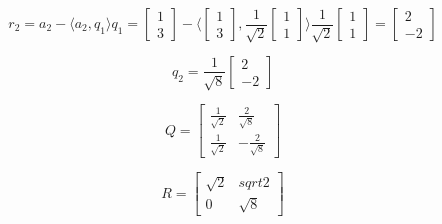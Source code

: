 \[ 
    r_2 = a_2 - \langle a_2, q_1\rangle q_1 
    = 
    \begin{bmatrix} 1 \\ 3 \end{bmatrix}
    - 
    \langle  
    \begin{bmatrix} 1 \\ 3 \end{bmatrix}
    ,
    \frac{1}{\sqrt{2}} \begin{bmatrix} 1 \\ 1 \end{bmatrix}
    \rangle    
    \frac{1}{\sqrt{2}} 
    \begin{bmatrix} 1 \\ 1 \end{bmatrix}
    = 
    \begin{bmatrix}
        2 \\ -2 
    \end{bmatrix}
\]

\[
    q_2 =
    \frac{1}{\sqrt{8}}
    \begin{bmatrix}
        2 \\ -2 
    \end{bmatrix}
\]

\[
    Q = 
    \begin{bmatrix}
        \frac{1}{\sqrt{2}} & \frac{2}{\sqrt{8}} \\
        \frac{1}{\sqrt{2}} & -\frac{2}{\sqrt{8}}
    \end{bmatrix}
\]

\[
    R =
    \begin{bmatrix}
        \sqrt{2} & sqrt{2} \\
        0    &    \sqrt{8}
    \end{bmatrix}
\]

